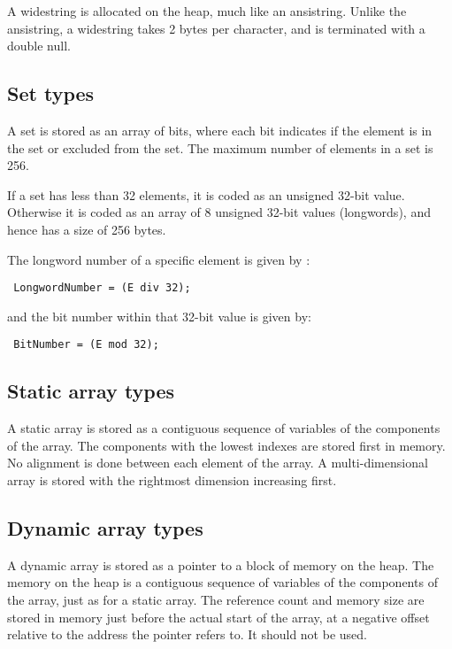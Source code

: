 A widestring is allocated on the heap, much like an ansistring. Unlike the
ansistring, a widestring takes 2 bytes per character, and is terminated with
a double null. 

\subsection{Set types}

A set is stored as an array of bits, where each bit indicates
if the element is in the set or excluded from the set. The maximum
number of elements in a set is 256.

If a set has less than 32 elements, it is coded as an unsigned
32-bit value. Otherwise it is coded as an array of 8 
unsigned 32-bit values (longwords), and hence has a size of 256 bytes.

The longword number of a specific element  is given by :

\begin{verbatim}
 LongwordNumber = (E div 32);
\end{verbatim}

and the bit number within that 32-bit value is given by:
\begin{verbatim}
 BitNumber = (E mod 32);
\end{verbatim}

\subsection{Static array types}

A static array is stored as a contiguous sequence of variables
of the components of the array. The components with the
lowest indexes are stored first in memory. No alignment
is done between each element of the array. A multi-dimensional
array is stored with the rightmost dimension increasing first.

\subsection{Dynamic array types}

A dynamic array is stored as a pointer to a block of memory on the heap.
The memory on the heap is a contiguous sequence of variables
of the components of the array, just as for a static array. The reference
count and memory size are stored in memory just before the actual start of
the array, at a negative offset relative to the address the pointer refers
to. It should not be used.

